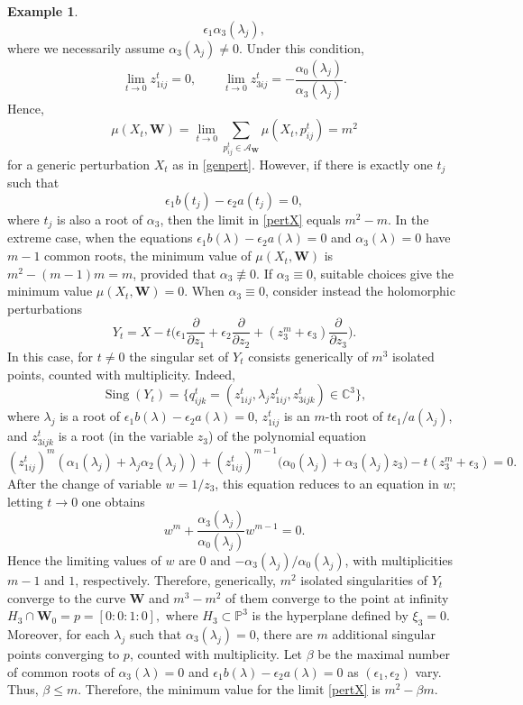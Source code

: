 \documentclass[10pt,twoside]{amsart}
\numberwithin{equation}{section}
\theoremstyle{definition}
\newtheorem{example}[proposition]{Example}
\theoremstyle{remark}
\DeclareMathOperator{\sing}{Sing}
\newcommand{\C}{\mathbb{C}}
\newcommand{\W}{\mathbf{W}}
\begin{document}
\begin{example}
\[{\epsilon_1\alpha_3(\lambda_j)},
\]
where we necessarily assume $\alpha_3(\lambda_j)\ne 0$. Under this condition,
\[
\lim_{t\to 0}z_{1ij}^t=0,
\qquad
\lim_{t\to 0}z_{3ij}^t=-\frac{\alpha_0(\lambda_j)}{\alpha_3(\lambda_j)}.
\]
Hence,
\begin{equation}\label{pertX}
\mu(X_t,\W)= \lim_{t\to0}\sum_{p_{ij}^t\in \mathcal{A}_{\W}}\mu(X_t,p_{ij}^t)=m^2
\end{equation}
for a generic perturbation $X_t$ as in \eqref{genpert}.
However, if there is exactly one $t_j$ such that \[\epsilon_1 b(t_j)-\epsilon_2a(t_j)=0,\] where $t_j$ is also a root of $\alpha_3$,
then the limit in \eqref{pertX} equals $m^2-m$. In the extreme case, when the equations
$\epsilon_1 b(\lambda)-\epsilon_2a(\lambda)=0$ and $\alpha_3(\lambda)=0$ have $m-1$ common roots,
the minimum value of $\mu(X_t,\W)$ is $m^2-(m-1)m=m$, provided that $\alpha_3\not\equiv 0$.
If $\alpha_3\equiv 0$, suitable choices give the minimum value $\mu(X_t,\W)=0$.
When $\alpha_3\equiv0$, consider instead the holomorphic perturbations
\begin{equation}\label{genpert2}
Y_t=X-t\bigg(\epsilon_1\frac{\partial}{\partial z_1}
+\epsilon_2\frac{\partial}{\partial z_2}
+(z_3^m+\epsilon_3)\frac{\partial}{\partial z_3}\bigg).
\end{equation}
In this case, for $t\ne 0$ the singular set of $Y_t$ consists generically of $m^3$ isolated points, counted with multiplicity.
Indeed,
\[
\sing(Y_t)=\{ q^t_{ijk}=(z^t_{1ij},\lambda_j z^t_{1ij},z^t_{3ijk})\in\C^3\},
\]
where $\lambda_j$ is a root of $\epsilon_1b(\lambda)-\epsilon_2a(\lambda)=0$,
$z_{1ij}^t$ is an $m$-th root of $t\epsilon_1/a(\lambda_j)$,
and $z^t_{3ijk}$ is a root (in the variable $z_3$) of the polynomial equation
\[
(z^t_{1ij})^m(\alpha_1(\lambda_j)+\lambda_j\alpha_2(\lambda_j))
+(z^t_{1ij})^{m-1}\big(\alpha_0(\lambda_j)+\alpha_3(\lambda_j)z_3\big)
-t(z_3^m+\epsilon_3)=0.
\]
After the change of variable $w=1/z_3$, this equation reduces to an equation in $w$; letting $t\to 0$ one obtains
\[
w^m+\frac{\alpha_3(\lambda_j)}{\alpha_0(\lambda_j)}w^{m-1}=0.
\]
Hence the limiting values of $w$ are $0$ and $-\alpha_3(\lambda_j)/\alpha_0(\lambda_j)$, with multiplicities $m-1$ and $1$, respectively.
Therefore, generically, $m^2$ isolated singularities of $Y_t$ converge to the curve $\W$ and $m^3-m^2$ of them converge
to the point at infinity
$
H_3\cap\W_0=p=[0:0:1:0],
$
where $H_3\subset\mathbb{P}^3$ is the hyperplane defined by $\xi_3=0$.
Moreover, for each $\lambda_j$ such that $\alpha_3(\lambda_j)=0$, there are $m$ additional singular points converging to $p$,
counted with multiplicity. Let $\beta$ be the maximal number of common roots of $\alpha_3(\lambda)=0$ and
$\epsilon_1 b(\lambda)-\epsilon_2a(\lambda)=0$ as $(\epsilon_1,\epsilon_2)$ vary. Thus, $\beta\leq m$.
Therefore, the minimum value for the limit \eqref{pertX} is  $m^2-\beta m.$


\end{example}
\end{document}
